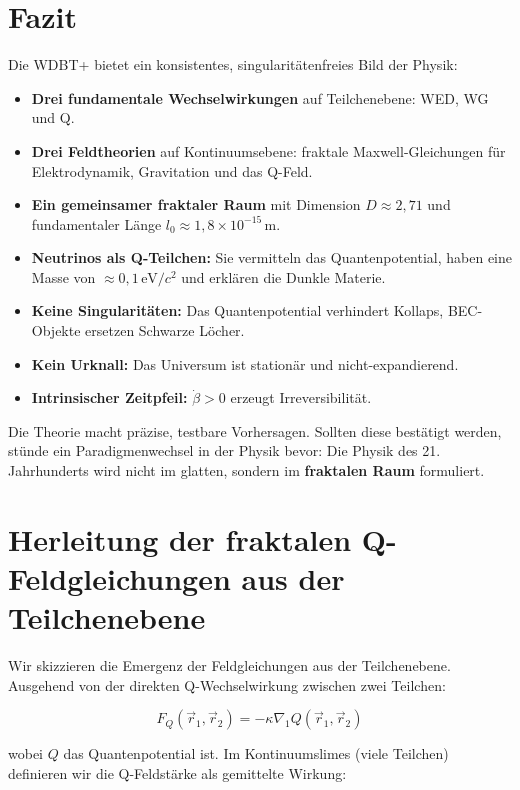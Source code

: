 \documentclass[12pt,a4paper]{article}
\begin{document}
\section{Fazit}

Die WDBT+ bietet ein konsistentes, singularitätenfreies Bild der Physik:

\begin{itemize}
    \item \textbf{Drei fundamentale Wechselwirkungen} auf Teilchenebene: WED, WG und Q.
    \item \textbf{Drei Feldtheorien} auf Kontinuumsebene: fraktale Maxwell-Gleichungen für Elektrodynamik, Gravitation und das Q-Feld.
    \item \textbf{Ein gemeinsamer fraktaler Raum} mit Dimension \(D \approx 2,71\) und fundamentaler Länge \(l_0 \approx 1,8 \times 10^{-15} \, \text{m}\).
    \item \textbf{Neutrinos als Q-Teilchen:} Sie vermitteln das Quantenpotential, haben eine Masse von \(\approx 0,1 \, \text{eV}/c^2\) und erklären die Dunkle Materie.
    \item \textbf{Keine Singularitäten:} Das Quantenpotential verhindert Kollaps, BEC-Objekte ersetzen Schwarze Löcher.
    \item \textbf{Kein Urknall:} Das Universum ist stationär und nicht-expandierend.
    \item \textbf{Intrinsischer Zeitpfeil:} \(\dot{\beta} > 0\) erzeugt Irreversibilität.
\end{itemize}

Die Theorie macht präzise, testbare Vorhersagen. Sollten diese bestätigt werden, stünde ein Paradigmenwechsel in der Physik bevor: Die Physik des 21. Jahrhunderts wird nicht im glatten, sondern im \textbf{fraktalen Raum} formuliert.

\appendix

\section{Herleitung der fraktalen Q-Feldgleichungen aus der Teilchenebene}

Wir skizzieren die Emergenz der Feldgleichungen aus der Teilchenebene. Ausgehend von der direkten Q-Wechselwirkung zwischen zwei Teilchen:

\[
F_Q(\vec{r}_1, \vec{r}_2) = -\kappa \nabla_1 Q(\vec{r}_1, \vec{r}_2)
\]

wobei \(Q\) das Quantenpotential ist. Im Kontinuumslimes (viele Teilchen) definieren wir die Q-Feldstärke als gemittelte Wirkung:
\end{document}

